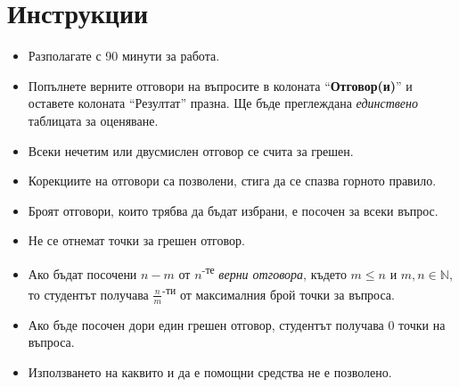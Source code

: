 \section*{Инструкции}

\begin{itemize}
  \item Разполагате с 90 минути за работа.
  \item Попълнете верните отговори на въпросите в колоната "`\textbf{Отговор(и)}"'
    и оставете колоната "`Резултат"' празна. Ще бъде преглеждана \emph{единствено}
    таблицата за оценяване.
  \item Всеки нечетим или двусмислен отговор се счита за грешен.
  \item Корекциите на отговори са позволени, стига да се спазва горното правило.
  \item Броят отговори, които трябва да бъдат избрани, е посочен за всеки  въпрос.
  \item Не се отнемат точки за грешен отговор.
  \item Ако бъдат посочени $n-m$ от $n$\textsuperscript{-те} \emph{верни
      отговора}, където $m \leq n$ и $m,n \in \mathbb{N}$, то студентът получава
    $\frac{n}{m}$\textsuperscript{-ти} от максималния брой точки за въпроса.
  \item Ако бъде посочен дори един грешен отговор, студентът получава $0$ точки на
    въпроса.
  \item Използването на каквито и да е помощни средства не е позволено.
\end{itemize}
